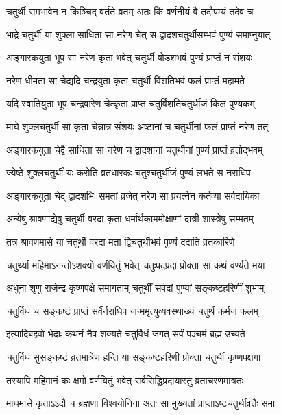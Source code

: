\twolineshloka
{चतुर्थी समभावेन न किञ्चिद् वर्तते व्रतम्}
{अतः किं वर्णनीयं वै तदौपम्यं तदेव च} %

\twolineshloka
{भाद्रे चतुर्थी या शुक्ला साधिता सा नरेण चेत्}
{स द्वादशचतुर्थीसम्भवं पुण्यं समाप्नुयात्} %

\twolineshloka
{अङ्गारकयुता भूप सा नरेण कृता भवेत्}
{चतुर्थी षोडशभवं पुण्यं प्राप्तं न संशयः} %

\twolineshloka
{नरेण धीमता सा चेद्यदि चन्द्रयुता कृता}
{चतुर्थी विंशतिभवं फलं प्राप्तं महामते} %

\twolineshloka
{यदि स्वातियुता भूप चन्द्रवारेण चेत्कृता}
{प्राप्तं चतुर्विंशतिचतुर्थीजं किल पुण्यकम्} %

\twolineshloka
{माघे शुक्लचतुर्थी सा कृता चेन्नात्र संशयः}
{अष्टानां च चतुर्थीनां फलं प्राप्तं नरेण तत्} %

\twolineshloka
{अङ्गारकयुता चेद्वै साधिता सा नरेण च}
{द्वादशानां चतुर्थीनां पुण्यं प्राप्तं व्रतोद्भवम्} %

\twolineshloka
{ज्येष्ठे शुक्लचतुर्थीं यः करोति व्रतधारकः}
{चतुश्चतुर्थीजं पुण्यं लभते स नराधिप} %

\twolineshloka
{अङ्गारकयुता चेद् द्वादशभिः समतां व्रजेत्}
{नरेण सा प्रयत्नेन कर्तव्या सर्वदायिका} %

\twolineshloka
{अन्येषु श्रावणाद्येषु चतुर्थी वरदा कृता}
{धर्मार्थकाममोक्षाणां दात्री शास्त्रेषु सम्मतम्} %

\twolineshloka
{तत्र श्रावणमासे या चतुर्थी वरदा मता}
{द्विचतुर्थीभवं पुण्यं ददाति व्रतकारिणे} %

\twolineshloka
{चतुर्थ्या महिमाऽनन्तोऽशक्यो वर्णयितुं भवेत्}
{चतुःपदप्रदा प्रोक्ता सा कथं वर्ण्यते मया} %

\twolineshloka
{अधुना श‍ृणु राजेन्द्र कृष्णपक्षे समागताम्}
{चतुर्थीं सर्वदां पुण्यां सङ्कष्टहरिणीं शुभाम्} %

\twolineshloka
{चतुर्विधं च सङ्कष्टं प्राप्तं सर्वैर्नराधिप}
{जन्ममृत्युव्यवस्थाख्यं चतुर्थं कर्मजं फलम्} %

\twolineshloka
{इत्यादिबहवो भेदाः कथनं नैव शक्यते}
{चतुर्विधं जगत् सर्वं पञ्चमं ब्रह्म उच्यते} %

\twolineshloka
{चतुर्विधं सुसङ्कष्टं व्रतमात्रेण हन्ति या}
{सङ्कष्टहरिणी प्रोक्ता चतुर्थी कृष्णपक्षगा} %

\twolineshloka
{तस्यापि महिमानं कः क्षमो वर्णयितुं भवेत्}
{सर्वसिद्धिप्रदायास्तु व्रताचरणमात्रतः} %

\twolineshloka
{माघमासे कृताऽऽदौ च ब्रह्मणा विश्वयोनिना}
{अतः सा मुख्यतां प्राप्ताऽष्टचतुर्थीव्रतैः समा} %

